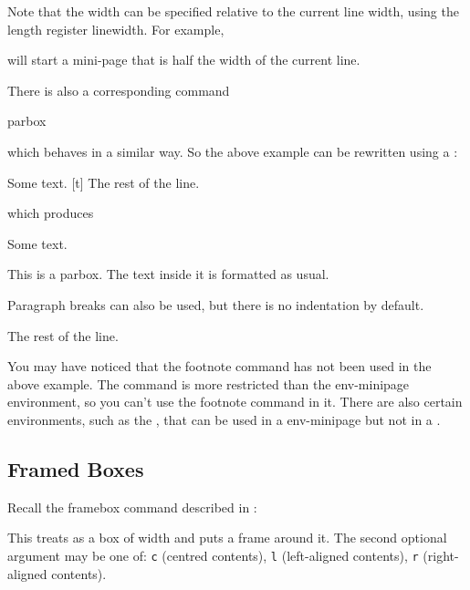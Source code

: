 Note that the width can be specified relative to the current
line width, using the \gls{length} register \gls{linewidth}. For example,
\begin{alltt}
\end{alltt}
will start a mini-page that is half the width of the current
line.

There is also a corresponding command
\begin{definition}
\gls{parbox}%
\end{definition}%
which behaves in a similar way. So the above example can be 
rewritten using a :
\begin{code}
Some text.\newline
{}[t]\marg{2in}\newline
The rest of the line.
\end{code}
which produces
\begin{result}
Some text.
\parbox[t]{2in}{This is a parbox. 
The text inside
it is formatted as usual.

Paragraph breaks can also be used, but 
there is no indentation by default.}
The rest of the line.
\end{result}
You may have noticed that the \gls{footnote} command has
not been used in the above example.  The  command 
is more restricted than the
\gls{env-minipage} environment, so you can't use the 
\gls{footnote} command in it. There are also certain 
environments, such as the 
, that can be
used in a \gls{env-minipage} but not in a .

\subsection{Framed Boxes}
\label{sec:fbox}

Recall the \gls{framebox} command described in :
\begin{definition}
\end{definition}
This treats  as a box of width  and puts a frame around it.
The second optional argument may be one of: \texttt{c} (centred
contents), \texttt{l} (left-aligned contents), \texttt{r}
(right-aligned contents).

